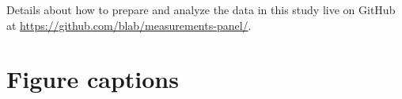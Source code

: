 \documentclass[utf8]{FrontiersinHarvard} %
\begin{document}
Details about how to prepare and analyze the data in this study live on GitHub at \url{https://github.com/blab/measurements-panel/}.





\section*{Figure captions}

\end{document}
